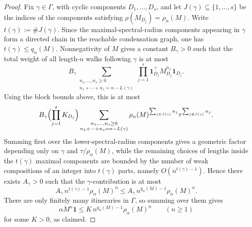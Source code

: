 \documentclass{etds}%
\numberwithin{equation}{section}
\theoremstyle{plain}
\theoremstyle{definition}
\theoremstyle{remark}
\begin{document}
\begin{proof}
Fix $\gamma\in\Gamma$, with cyclic components $D_1,\dots,D_s$, and let
$J(\gamma)\subseteq\{1,\dots,s\}$ be the indices of the components satisfying
$\rho(M_{D_j})=\rho_\alpha(M)$.  Write $t(\gamma):=\#J(\gamma)$.  Since the
maximal-spectral-radius components appearing in $\gamma$ form a directed chain
in the reachable condensation graph, one has $t(\gamma)\le q_\alpha(M)$.
Nonnegativity of $M$ gives a constant $B_\gamma>0$ such that the total weight
of all length-$n$ walks following $\gamma$ is at most
\[
B_\gamma
\sum_{\substack{n_1,\dots,n_s\ge 0\\
n_1+\cdots+n_s=n-L(\gamma)}}
\prod_{j=1}^s \mathbf{1}_{D_j}^\top M_{D_j}^{n_j}\mathbf{1}_{D_j}.
\]
Using the block bounds above, this is at most
\[
B_\gamma\Bigl(\prod_{j=1}^s K_{D_j}\Bigr)
\sum_{\substack{n_1,\dots,n_s\ge 0\\
n_1+\cdots+n_s=n-L(\gamma)}}
\rho_\alpha(M)^{\sum_{j\in J(\gamma)}n_j}\tau^{\sum_{j\notin J(\gamma)}n_j}.
\]
Summing first over the lower-spectral-radius components gives a geometric
factor depending only on $\gamma$ and $\tau/\rho_\alpha(M)$, while the
remaining choices of lengths inside the $t(\gamma)$ maximal components are
bounded by the number of weak compositions of an integer into $t(\gamma)$
parts, namely $O(n^{t(\gamma)-1})$.  Hence there exists $A_\gamma>0$ such that
the $\gamma$-contribution is at most
\[
A_\gamma\,n^{t(\gamma)-1}\rho_\alpha(M)^n
\le A_\gamma\,n^{q_\alpha(M)-1}\rho_\alpha(M)^n.
\]
There are only finitely many itineraries in $\Gamma$, so summing over them
gives
\[
\alpha M^n\mathbf{1}\le K\,n^{q_\alpha(M)-1}\rho_\alpha(M)^n
\qquad(n\ge 1)
\]
for some $K>0$, as claimed.
\end{proof}
\end{document}
